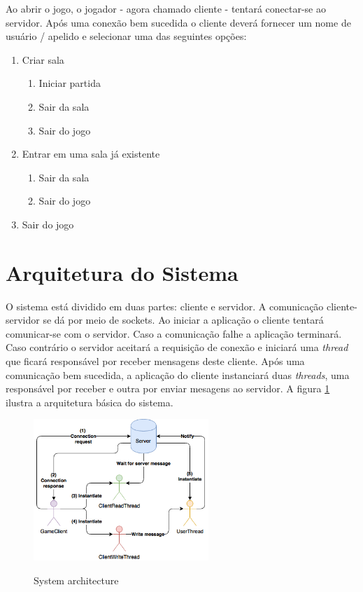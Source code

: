 \documentclass[conference]{IEEEtran}
\begin{document}
Ao abrir o jogo, o jogador - agora chamado cliente - tentará conectar-se ao servidor. Após uma conexão bem sucedida o cliente deverá fornecer um nome de usuário / apelido e selecionar uma das seguintes opções:

\begin{enumerate}
\item Criar sala
  \begin{enumerate}
  \item Iniciar partida
  \item Sair da sala
  \item Sair do jogo
  \end{enumerate}

\item Entrar em uma sala já existente
  \begin{enumerate}
  \item Sair da sala
  \item Sair do jogo
  \end{enumerate}

\item Sair do jogo
\end{enumerate}

\section{Arquitetura do Sistema}
O sistema está dividido em duas partes: cliente e servidor.
A comunicação cliente-servidor se dá por meio de sockets.
Ao iniciar a aplicação o cliente tentará comunicar-se com o servidor. Caso a comunicação falhe a aplicação terminará. Caso contrário o servidor aceitará a requisição de conexão e iniciará uma \textit{thread} que ficará responsável por receber mensagens deste cliente.
Após uma comunicação bem sucedida, a aplicação do cliente instanciará duas \textit{threads}, uma responsável por receber e outra por enviar mesagens ao servidor. A figura \ref{fig:sysarch} ilustra a arquitetura básica do sistema.

\begin{figure}[ht]
\caption{System architecture}
\centering
\includegraphics[width=250px]{images/Architecture}
\setlength{\abovecaptionskip}{15px}
\label{fig:sysarch}
\end{figure}
\end{document}
